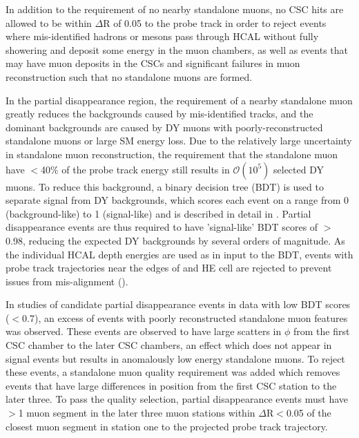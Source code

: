 In addition to the requirement of no nearby standalone muons, no CSC hits are allowed to be within $\Delta$R of 0.05 to the probe track in order to reject events where mis-identified hadrons or mesons pass through HCAL without fully showering and deposit some energy in the muon chambers, as well as events that may have muon deposits in the CSCs and significant failures in muon reconstruction such that no standalone muons are formed.

In the partial disappearance region, the requirement of a nearby standalone muon greatly reduces the backgrounds caused by mis-identified tracks, and the dominant backgrounds are caused by DY muons with poorly-reconstructed standalone muons or large SM energy loss.
Due to the relatively large uncertainty in standalone muon reconstruction, the requirement that the standalone muon have $<$40$\%$ of the probe track energy still results in $\mathcal{O}(10^{5})$ selected DY muons.
To reduce this background, a binary decision tree (BDT) is used to separate signal from DY backgrounds, which scores each event on a range from 0 (background-like) to 1 (signal-like) and is described in detail in .
Partial disappearance events are thus required to have 'signal-like' BDT scores of $>$0.98, reducing the expected DY backgrounds by several orders of magnitude.
As the individual HCAL depth energies are used as in input to the BDT, events with probe track trajectories near the edges of and HE cell are rejected to prevent issues from mis-alignment ().

In studies of candidate partial disappearance events in data with low BDT scores ($<$0.7), an excess of events with poorly reconstructed standalone muon features was observed.
These events are observed to have large scatters in $\phi$ from the first CSC chamber to the later CSC chambers, an effect which does not appear in signal events but results in anomalously low energy standalone muons.
To reject these events, a standalone muon quality requirement was added which removes events that have large differences in position from the first CSC station to the later three.
To pass the quality selection, partial disappearance events must have $>$1 muon segment in the later three muon stations within $\Delta$R$<$0.05 of the closest muon segment in station one to the projected probe track trajectory.
